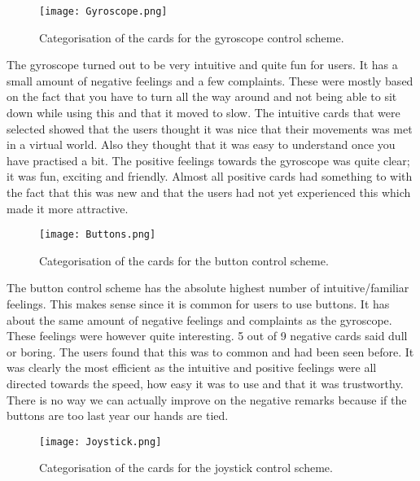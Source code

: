 \begin{figure}[H]
\centering
\texttt{[image: Gyroscope.png]}
\caption{Categorisation of the cards for the gyroscope control scheme.}
\end{figure}

The gyroscope turned out to be very intuitive and quite fun for users. It has a small amount of negative feelings and a few complaints. These were mostly based on the fact that you have to turn all the way around and not being able to sit down while using this and that it moved to slow. 
The intuitive cards that were selected showed that the users thought it was nice that their movements was met in a virtual world. Also they thought that it was easy to understand once you have practised a bit. 
The positive feelings towards the gyroscope was quite clear; it was fun, exciting and friendly. Almost all positive cards had something to with the fact that this was new and that the users had not yet experienced this which made it more attractive.

\begin{figure}[H]
\centering
\texttt{[image: Buttons.png]}
\caption{Categorisation of the cards for the button control scheme.}
\end{figure}

The button control scheme has the absolute highest number of intuitive/familiar feelings. This makes sense since it is common for users to use buttons. 
It has about the same amount of negative feelings and complaints as the gyroscope. These feelings were however quite interesting. 5 out of 9 negative cards said dull or boring. The users found that this was to common and had been seen before. It was clearly the most efficient as the intuitive and positive feelings were all directed towards the speed, how easy it was to use and that it was trustworthy. 
There is no way we can actually improve on the negative remarks because if the buttons are too last year our hands are tied.

\begin{figure}[H]
\centering
\texttt{[image: Joystick.png]}
\caption{Categorisation of the cards for the joystick control scheme.}
\label{joystickEvaluationResults}
\end{figure}

